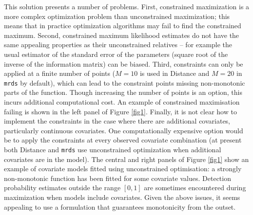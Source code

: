 \documentclass[authoryear,preprint,review,12pt]{elsarticle}
\begin{document}
This solution presents a number of problems. First, constrained maximization is a more complex optimization problem than unconstrained maximization; this means that in practice optimization algorithms may fail to find the constrained maximum.  Second, constrained maximum likelihood estimates do not have the same appealing properties as their unconstrained relatives -- for example the usual estimator of the standard error of the parameters (square root of the inverse of the information matrix) can be biased.  Third, constraints can only be applied at a finite number of points ($M=10$ is used in Distance and $M=20$ in \texttt{mrds} by default), which can lead to the constraint points missing non-monotonic parts of the function. Though increasing the number of points is an option, this incurs additional computational cost. An example of constrained maximisation failing is shown in the left panel of Figure \ref{fig1}. Finally, it is not clear how to implement the constraints in the case where there are additional covariates, particularly continuous covariates. One computationally expensive option would be to apply the constraints at every observed covariate combination (at present both Distance and \texttt{mrds} use unconstrained optimization when additional covariates are in the model). The central and right panels of Figure \ref{fig1} \citep[from][]{Pike:2003ug} show an example of covariate models fitted using unconstrained optimisation: a strongly non-monotonic function has been fitted for some covariate values. Detection probability estimates outside the range $[0,1]$ are sometimes encountered during maximization when models include covariates. Given the above issues, it seems appealing to use a formulation that guarantees monotonicity from the outset.
\end{document}
